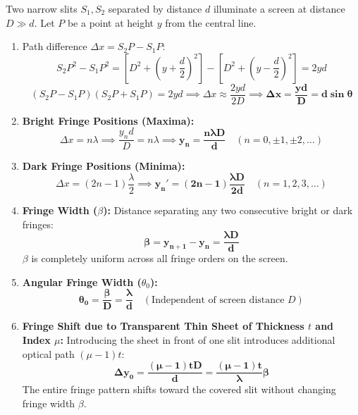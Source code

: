 \documentclass[10pt,twoside,openright]{book}
\begin{document}
\begin{formulabox}
Two narrow slits $S_1, S_2$ separated by distance $d$ illuminate a screen at distance $D \gg d$. Let $P$ be a point at height $y$ from the central line.
\begin{enumerate}
  \item Path difference $\Delta x = S_2 P - S_1 P$:
  \begin{equation}
    S_2 P^2 - S_1 P^2 = \left[D^2 + \left(y + \frac{d}{2}\right)^2\right] - \left[D^2 + \left(y - \frac{d}{2}\right)^2\right] = 2yd
  \end{equation}
  \begin{equation}
    (S_2 P - S_1 P)(S_2 P + S_1 P) = 2yd \implies \Delta x \approx \frac{2yd}{2D} \implies \mathbf{\Delta x = \frac{yd}{D} = d\sin\theta}
  \end{equation}
  \item \textbf{Bright Fringe Positions (Maxima):}
  \begin{equation}
    \Delta x = n\lambda \implies \frac{y_n d}{D} = n\lambda \implies \mathbf{y_n = \frac{n\lambda D}{d}} \quad (n = 0, \pm 1, \pm 2, \dots)
  \end{equation}
  \item \textbf{Dark Fringe Positions (Minima):}
  \begin{equation}
    \Delta x = (2n-1)\frac{\lambda}{2} \implies \mathbf{y_n' = (2n-1)\frac{\lambda D}{2d}} \quad (n = 1, 2, 3, \dots)
  \end{equation}
  \item \textbf{Fringe Width ($\beta$):} Distance separating any two consecutive bright or dark fringes:
  \begin{equation}
    \mathbf{\beta = y_{n+1} - y_n = \frac{\lambda D}{d}}
  \end{equation}
  $\beta$ is completely uniform across all fringe orders on the screen.
  \item \textbf{Angular Fringe Width ($\theta_0$):}
  \begin{equation}
    \mathbf{\theta_0 = \frac{\beta}{D} = \frac{\lambda}{d}} \quad (\text{Independent of screen distance } D)
  \end{equation}
  \item \textbf{Fringe Shift due to Transparent Thin Sheet of Thickness $t$ and Index $\mu$:}
  Introducing the sheet in front of one slit introduces additional optical path $(\mu - 1)t$:
  \begin{equation}
    \mathbf{\Delta y_0 = \frac{(\mu - 1)t D}{d} = \frac{(\mu - 1)t}{\lambda}\beta}
  \end{equation}
  The entire fringe pattern shifts toward the covered slit without changing fringe width $\beta$.
\end{enumerate}
\end{formulabox}
\end{document}
